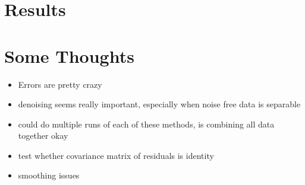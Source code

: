 \documentclass[10pt]{article}
\begin{document}
\section{Results}



\section{Some Thoughts}
\begin{itemize}
\item Errors are pretty crazy
\item denoising seems really important, especially when noise free data is separable
\item could do multiple runs of each of these methods, is combining all data together okay
\item test whether covariance matrix of residuals is identity
\item smoothing issues
\end{itemize}
\end{document}
